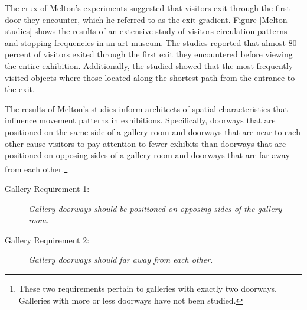 \documentclass[12pt]{ucthesis}
\begin{document}
The crux of Melton's experiments suggested that visitors exit through the first door they encounter, which he referred to as the exit gradient. Figure \ref{Melton-studies} shows the results of an extensive study of visitors circulation patterns and stopping frequencies in an art museum. The studies reported that almost 80 percent of visitors exited through the first exit they encountered before viewing the entire exhibition. Additionally, the studied showed that the most frequently visited objects where those located along the shortest path from the entrance to the exit. 


The results of Melton's studies inform architects of spatial characteristics that influence movement patterns in exhibitions. Specifically, doorways that are positioned on the same side of a gallery room and doorways that are near to each other cause visitors to pay attention to fewer exhibits than doorways that are positioned on opposing sides of a gallery room and doorways that are far away from each other.\footnote[1]{These two requirements pertain to galleries with exactly two doorways. Galleries with more or less doorways have not been studied.}

\begin{description}
\item[Gallery Requirement 1:] \emph{Gallery doorways should be positioned on opposing sides of the gallery room.} 
\item[Gallery Requirement 2:] \emph{Gallery doorways should far away from each other.} 
\end{description}
\end{document}
